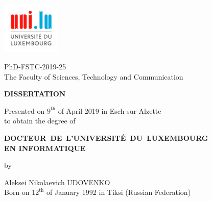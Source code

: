 \begin{titlepage}
\begin{center}

\vspace{-1.0cm} %

\href{https://www.uni.lu}{\includegraphics[height=2.5cm]{-Figures/uniLux_logo.jpg}}\\

\vspace{0.5cm}

PhD-FSTC-2019-25\\
The Faculty of Sciences, Technology and Communication \\

\vspace{1.5cm} %

\textbf{\Large DISSERTATION}\\

\vspace{0.5cm}

Presented on $9^{\text{th}}$ of April 2019 in Esch-sur-Alzette \\
to obtain the degree of \\

\vspace{0.5cm}

\textbf{\Large \mbox{DOCTEUR DE L'UNIVERSITÉ DU LUXEMBOURG}} \\
\vspace{0.25cm}
\textbf{\Large EN INFORMATIQUE} \\

\vspace{0.4cm}

by

\vspace{0.5cm}

{\LARGE Aleksei Nikolaevich UDOVENKO}\\
\vspace{0.1cm}
{\small Born on $12^{\text{th}}$ of January 1992 in Tiksi (Russian Federation)}

\vspace{0.3cm} %


\end{center}
\end{titlepage}
